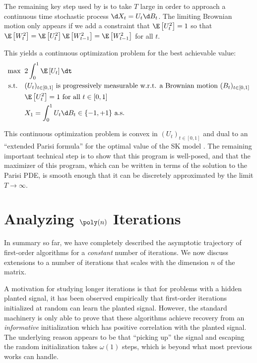 \documentclass[12pt]{article}
\begin{document}
The remaining key step used by \cite{montanari2021optimization} is to take $T$ large
in order to approach a continuous time stochastic process $\d X_t = U_t \d B_t$.
The limiting Brownian motion only appears if we add a constraint that $\E\left[U_t^2\right] = 1$ so that $\E\left[W_t^2\right] = \E\left[U_t^2\right]\E\left[W_{t-1}^2\right] = \E\left[W_{t-1}^2\right]$ for all $t$.


This yields a continuous optimization problem for the best achievable value:
\begin{align*}
    \max \;\;& 2\int_0^1 \E\left[U_t\right] \dt\\
    \textnormal{s.t. }\;\;
    &(U_t)_{t \in [0,1]} \text{ is progressively measurable w.r.t. a Brownian motion $(B_t)_{t \in [0,1]}$}\\
    & \E\left[U_t^2\right] = 1 \text{ for all $t \in [0,1]$}\\
    &X_1 = \int_{0}^1 U_t \d B_t \in \{-1, +1\} \text{ a.s.}
\end{align*}

This continuous optimization problem is convex in $(U_t)_{t \in [0,1]}$ and dual to an ``extended Parisi formula'' for the optimal value of the SK model \cite[Section 4]{AMS20:pSpinGlasses}.
The remaining important technical step is to show that this program is well-posed, and that the maximizer of this program, which can be written in terms of the solution to the Parisi PDE, is smooth enough that it can be discretely approximated by the limit $T \to \infty$.
  
\section{Analyzing \texorpdfstring{$\poly(n)$}{poly(n)} Iterations}
\label{sec:polyn-iterations}

In summary so far, we have completely described the asymptotic trajectory of first-order algorithms for a \textit{constant} number of iterations.
We now discuss extensions to a number of iterations that scales with the dimension $n$ of the matrix.

A motivation for studying longer iterations is that
for problems with a hidden planted signal, it has been observed empirically that first-order iterations initialized at random can learn the planted signal. However, the standard machinery is only able to prove that these algorithms achieve recovery from an \emph{informative} initialization which has positive correlation with the planted signal. The underlying reason appears to be that ``picking up'' the signal and escaping the random initialization takes $\omega(1)$ steps, which is beyond what most previous works can handle.
\end{document}
